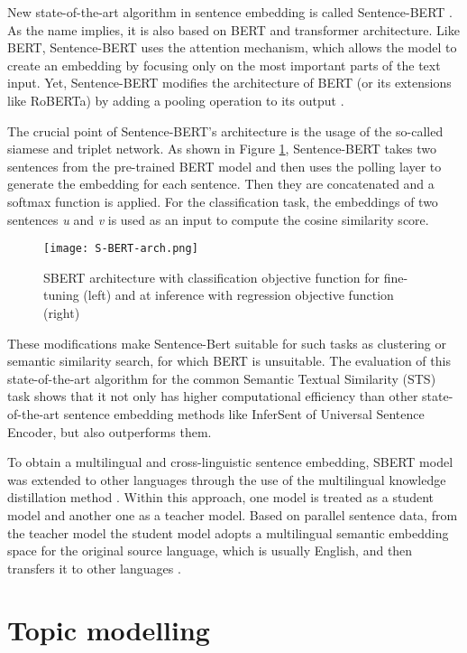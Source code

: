 \documentclass[fontsize=12pt,a4paper,twoside,openany]{scrbook}
\begin{document}
New state-of-the-art algorithm in sentence embedding is called Sentence-BERT \parencite{Reimers19}. As the name implies, it is also based on BERT and transformer architecture. Like BERT, Sentence-BERT uses the attention mechanism, which allows the model to create an embedding by focusing only on the most important parts of the text input. Yet, Sentence-BERT modifies the architecture of BERT (or its extensions like RoBERTa) by adding a pooling operation to its output \parencite{Reimers19}.

The crucial point of Sentence-BERT's architecture is the usage of the so-called siamese and triplet network. As shown in Figure \ref{fig:S-BERT-arch}, Sentence-BERT takes two sentences from the pre-trained BERT model and then uses the polling layer to generate the embedding for each sentence. Then they are concatenated and a softmax function is applied. For the classification task, the embeddings of two sentences \emph{u} and \emph{v} is used as an input to compute the cosine similarity score.


\begin{figure}[h]
\centering
\texttt{[image: S-BERT-arch.png]}
\caption{SBERT architecture with classification objective function for fine-tuning (left) and at inference with regression objective function (right) \parencite[from][]{Reimers19}}
\label{fig:S-BERT-arch}
\end{figure}

These modifications make Sentence-Bert suitable for such tasks as clustering or semantic similarity search, for which BERT is unsuitable. The evaluation of this state-of-the-art algorithm for the common Semantic Textual Similarity (STS) task shows that it not only has higher computational efficiency than other state-of-the-art sentence embedding methods like InferSent of Universal Sentence Encoder, but also outperforms them.

To obtain a multilingual and cross-linguistic sentence embedding, SBERT model was extended to other languages through the use of the multilingual knowledge distillation method \parencite{Reimers20}. Within this approach, one model is treated as a student model and another one as a teacher model. Based on parallel sentence data, from the teacher model the student model adopts a multilingual semantic embedding space for the original source language, which is usually English, and then transfers it to other languages \parencite{Reimers20}. 

\section{Topic modelling}
\label{sec:B}
\end{document}
